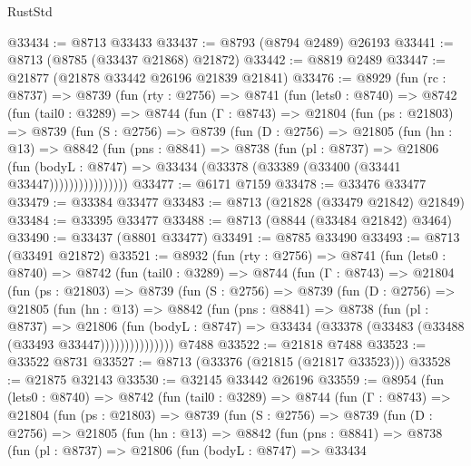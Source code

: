 \begin{lexlean}{RustStd}
\begin{coremodule}
@33434 := @8713 @33433
@33437 := @8793 (@8794 @2489) @26193
@33441 := @8713 (@8785 (@33437 @21868) @21872)
@33442 := @8819 @2489
@33447 := @21877 (@21878 @33442 @26196 @21839 @21841)
@33476 := @8929
    (fun (rc : @8737) =>
    @8739
      (fun (rty : @2756) =>
      @8741
        (fun (lets0 : @8740) =>
        @8742
          (fun (tail0 : @3289) =>
          @8744
            (fun (Γ : @8743) =>
            @21804
              (fun (ps : @21803) =>
              @8739
                (fun (S : @2756) =>
                @8739
                  (fun (D : @2756) =>
                  @21805
                    (fun (hn : @13) =>
                    @8842
                      (fun (pns : @8841) =>
                      @8738
                        (fun (pl : @8737) =>
                        @21806
                          (fun (bodyL : @8747) =>
                          @33434 (@33378 (@33389 (@33400 (@33441 @33447))))))))))))))))
@33477 := @6171 @7159
@33478 := @33476 @33477
@33479 := @33384 @33477
@33483 := @8713 (@21828 (@33479 @21842) @21849)
@33484 := @33395 @33477
@33488 := @8713 (@8844 (@33484 @21842) @3464)
@33490 := @33437 (@8801 @33477)
@33491 := @8785 @33490
@33493 := @8713 (@33491 @21872)
@33521 := @8932
    (fun (rty : @2756) =>
    @8741
      (fun (lets0 : @8740) =>
      @8742
        (fun (tail0 : @3289) =>
        @8744
          (fun (Γ : @8743) =>
          @21804
            (fun (ps : @21803) =>
            @8739
              (fun (S : @2756) =>
              @8739
                (fun (D : @2756) =>
                @21805
                  (fun (hn : @13) =>
                  @8842
                    (fun (pns : @8841) =>
                    @8738
                      (fun (pl : @8737) =>
                      @21806
                        (fun (bodyL : @8747) =>
                        @33434 (@33378 (@33483 (@33488 (@33493 @33447)))))))))))))))
    @7488
@33522 := @21818 @7488
@33523 := @33522 @8731
@33527 := @8713 (@33376 (@21815 (@21817 @33523)))
@33528 := @21875 @32143
@33530 := @32145 @33442 @26196
@33559 := @8954
    (fun (lets0 : @8740) =>
    @8742
      (fun (tail0 : @3289) =>
      @8744
        (fun (Γ : @8743) =>
        @21804
          (fun (ps : @21803) =>
          @8739
            (fun (S : @2756) =>
            @8739
              (fun (D : @2756) =>
              @21805
                (fun (hn : @13) =>
                @8842
                  (fun (pns : @8841) =>
                  @8738
                    (fun (pl : @8737) =>
                    @21806
                      (fun (bodyL : @8747) =>
                      @33434

\end{coremodule}
\end{lexlean}
